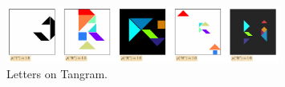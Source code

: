 \begin{figure}[h]
    \centering
    \includegraphics[width=0.8\textwidth]{images/curation_letters.pdf}
    \caption{Letters on Tangram.}
    \label{fig:curation_letters}
\end{figure}

